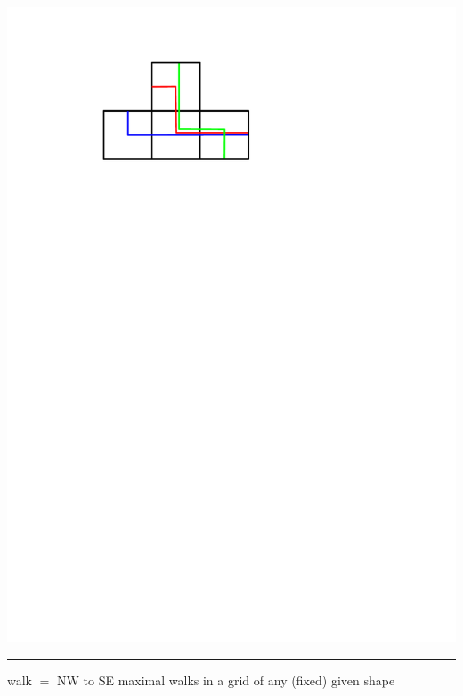 \documentclass[portrait,final,a0paper,fontscale=0.25]{baposter}
\theoremstyle{definition}
\begin{document}
\begin{poster}
{\hspace*{.15cm}\includegraphics[scale=.32]{NotAKiss}

\hspace*{.05cm}{\footnotesize The straight walks}
\hspace*{.8cm}{\footnotesize A kiss}
\hspace*{1.3cm}{\footnotesize A shy kiss}
\hspace*{1.1cm}{\footnotesize No kissing}



\vspace{-.2cm}
\hspace{-.25cm}
{\color{green} \rule{10.02cm}{1pt}}
\vspace{-.35cm}

{\color{green} walk} $=$ NW to SE maximal walks in a grid of any (fixed) given shape %

}
\end{poster}
\end{document}
